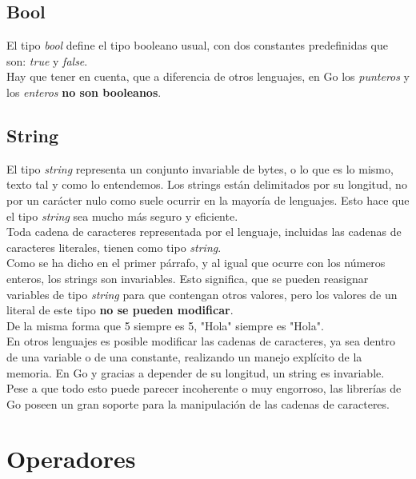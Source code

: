 	\subsection{Bool}

	El tipo \emph{bool} define el tipo booleano usual, con dos constantes
	predefinidas que son: \emph{true} y \emph{false}.\\

	Hay que tener en cuenta, que a diferencia de otros lenguajes, en Go los
	\emph{punteros} y los \emph{enteros} \textbf{no son booleanos}.

	\subsection{String}

	El tipo \emph{string} representa un conjunto invariable de bytes, o lo que es
	lo mismo, texto tal y como lo entendemos. Los strings están delimitados por
	su longitud, no por un carácter nulo como suele ocurrir en la mayoría de
	lenguajes. Esto hace que el tipo \emph{string} sea mucho más seguro y eficiente.\\

	Toda cadena de caracteres representada por el lenguaje, incluidas las
	cadenas de caracteres literales, tienen como tipo \emph{string}.\\

	Como se ha dicho en el primer párrafo, y al igual que ocurre con los números
	enteros, los strings son invariables. Esto significa, que se pueden
	reasignar variables de tipo \emph{string} para que contengan otros
	valores, pero los valores de un literal de este tipo \textbf{no se pueden
	modificar}.\\

	De la misma forma que 5 siempre es 5, "Hola" siempre es "Hola".\\

	En otros lenguajes es posible modificar las cadenas de caracteres, ya sea
	dentro de una variable o de una constante, realizando un manejo explícito de
	la memoria. En Go y gracias a depender de su longitud, un string es
	invariable.\\

	Pese a que todo esto puede parecer incoherente o muy engorroso, las
	librerías de Go poseen un gran soporte para la manipulación de las cadenas
	de caracteres.

\section{Operadores}

